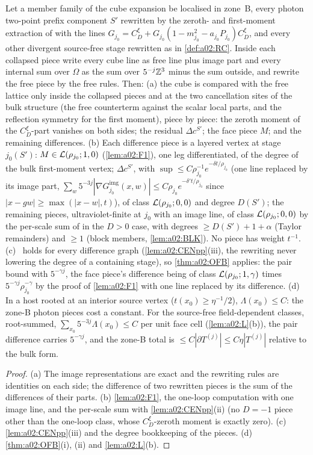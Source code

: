 \begin{theorem}\label{thm:a02:BVP}
Let a member family of the cube expansion be localised in zone~B, every photon two-point prefix component $S'$ rewritten by the zeroth- and first-moment extraction of \cite[(3.26)--(3.31)]{Ba3} with the lines $G_{j_0}=C^\xi_D+G_{j_0}(1-m^2_{j_0}-a_{j_0}P_{j_0})C^\xi_D$, and every other divergent source-free stage rewritten as in \cref{def:a02:RC}. Inside each collapsed piece write every cube line as free line plus image part and every internal sum over $\Omega$ as the sum over $5^{-j}\mathbb Z^3$ minus the sum outside, and rewrite the free piece by the free rules. Then: (a) the cube is compared with the free lattice only inside the collapsed pieces and at the two cancellation sites of the bulk structure (the free counterterm against the scalar local parts, and the reflection symmetry for the first moment), piece by piece: the zeroth moment of the $C^\xi_D$-part vanishes on both sides; the residual $\Delta c^{S'}$; the face piece $M$; and the remaining differences. (b) Each difference piece is a layered vertex at stage $j_0(S')$: $M\in\mathcal L(\rho_{j_0};1,0)$ (\cref{lem:a02:F1}), one leg differentiated, of the degree of the bulk first-moment vertex; $\Delta c^{S'}$, with $\sup\le C\rho_{j_0}^{-1}e^{-\delta t/\rho_{j_0}}$ (one line replaced by its image part, $\sum_w5^{-3j}|\nabla G^{\mathrm{img}}_{j_0}(x,w)|\le C\rho_{j_0}e^{-\delta't/\rho_{j_0}}$ since $|x-gw|\ge\max(|x-w|,t)$), of class $\mathcal L(\rho_{j_0};0,0)$ and degree $D(S')$; the remaining pieces, ultraviolet-finite at $j_0$ with an image line, of class $\mathcal L(\rho_{j_0};0,0)$ by the per-scale sum of \cite[(3.17)--(3.18)]{K2} in the $D>0$ case, with degrees $\ge D(S')+1+\alpha$ (Taylor remainders) and $\ge1$ (block members, \cref{lem:a02:BLK}). No piece has weight $t^{-1}$. (c) \DEGB\ holds for every difference graph (\cref{lem:a02:CENpp}(iii), the rewriting never lowering the degree of a containing stage), so \cref{thm:a02:OFB} applies: the pair bound with $5^{-\gamma j}$, the face piece's difference being of class $\mathcal L(\rho_{j_0};1,\gamma)$ times $5^{-\gamma j}\rho_{j_0}^{-\gamma}$ by the proof of \cref{lem:a02:F1} with one line replaced by its difference. (d) In a host rooted at an interior source vertex ($t(x_0)\ge\eta^{-1}/2$), $\Lambda(x_0)\le C$: the zone-B photon pieces cost a constant. For the source-free field-dependent classes, root-summed, $\sum_{x_0}5^{-3j}\Lambda(x_0)\le C$ per unit face cell (\cref{lem:a02:L}(b)), the pair difference carries $5^{-\gamma j}$, and the zone-B total is $\le C|\partial T^{(j)}|\le C\eta|T^{(j)}|$ relative to the bulk form.
\end{theorem}
\begin{proof}
(a) The image representations are exact and the rewriting rules are identities on each side; the difference of two rewritten pieces is the sum of the differences of their parts. (b) \cref{lem:a02:F1}, the one-loop computation with one image line, and the per-scale sum with \cref{lem:a02:CENpp}(ii) (no $D=-1$ piece other than the one-loop class, whose $C^\xi_D$-zeroth moment is exactly zero). (c) \cref{lem:a02:CENpp}(iii) and the degree bookkeeping of the pieces. (d) \cref{thm:a02:OFB}(i), (ii) and \cref{lem:a02:L}(b).
\end{proof}

